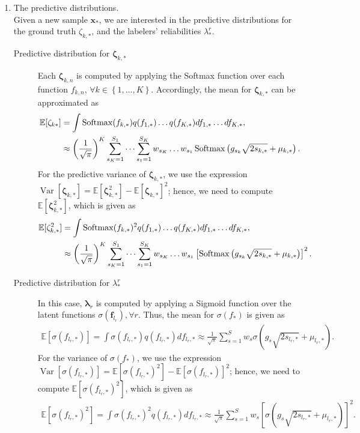\documentclass[9pt]{article}
\providecommand{\ve}[1]{{\bm{#1}}}%
\providecommand{\ve}[1]{{\mathbf{#1}}}
\begin{document}
\begin{enumerate}
\item The predictive distributions.\\
Given a new sample $\ve{x}_{*}$, we are interested in the predictive distributions for the ground truth $\zeta_{k,*}$, and the labelers' reliabilities $\lambda_{*}^r$.
\begin{description}
    \item[Predictive distribution for $\mathbf{\zeta}_{k,*}$] Each $\mathbf{\zeta}_{k,n}$ is computed by applying the Softmax function over each function $f_{k,n}$, $\forall k \in\left\{1,\dots , K\right\}$. Accordingly, the mean for $\mathbf{\zeta}_{k,*}$ can be approximated as
    \begin{align}
        \notag\mathbb{E}[\zeta_{k*}] &= \int \operatorname{Softmax}(f_{k,*}) q(f_{1,*})\dots q(f_{K,*}) df_{1,*}\dots df_{K,*},\\
        &\approx \left(\frac{1}{\sqrt{\pi}}\right)^{K}\sum_{s_K=1}^{S_1}\cdots \sum_{s_1=1}^{S_K} w_{s_K}\dots w_{s_1} \operatorname{Softmax}\left(g_{s_k}\sqrt{2s_{k,*}} + \mu_{k,*}\right).
    \end{align}
    For the predictive variance of $\mathbf{\zeta}_{k,*}$, we use the expression $\operatorname{Var}[\mathbf{\zeta}_{k,*}] = \mathbb{E}[\mathbf{\zeta}_{k,*}^2] - \mathbb{E}[\mathbf{\zeta}_{k,*}]^2$; hence, we need to compute $\mathbb{E}[\mathbf{\zeta}_{k,*}^2]$, which is given as
    \begin{align}
        \notag\mathbb{E}[\mathbf{\zeta}_{k,*}^2] &= \int \operatorname{Softmax}(f_{k,*})^2 q(f_{1,*})\dots q(f_{K,*}) df_{1,*}\dots df_{K,*},\\
        &\approx \left(\frac{1}{\sqrt{\pi}}\right)^{K}\sum_{s_K=1}^{S_1}\cdots \sum_{s_1=1}^{S_K} w_{s_K}\dots w_{s_1} \left[\operatorname{Softmax}\left(g_{s_k}\sqrt{2s_{k,*}} + \mu_{k,*}\right)\right]^2.
    \end{align}
    \item[Predictive distribution for $\lambda_{*}^r$] In this case, $\bm{\lambda}_r$ is computed by applying a Sigmoid function over the latent functions $\sigma(\mathbf{f}_{l_r}), \forall r$. Thus, the mean for $\sigma(f_{*})$ is given as
    \begin{align}
        \mathbb{E}[\sigma(f_{l_r,*})] = \int \sigma(f_{l_r,*}) q(f_{l_r,*})df_{l_r,*} \approx \frac{1}{\sqrt{\pi}}\sum_{s=1}^{S}w_s \sigma\left(g_s\sqrt{2s_{l_r,*}}  + \mu_{l_r,*}\right).
    \end{align}
    For the variance of $\sigma(f_{*})$, we use the expression $\operatorname{Var}[\sigma(f_{l_r,*})] = \mathbb{E}[\sigma(f_{l_r,*})^2] - \mathbb{E}[\sigma(f_{l_r,*})]^2$; hence, we need to compute $\mathbb{E}[\sigma(f_{l_r,*})^2]$, which is given as
    \begin{align}
        \mathbb{E}[\sigma(f_{l_r,*})^2] = \int \sigma(f_{l_r,*})^2 q(f_{l_r,*})df_{l_r,*} \approx \frac{1}{\sqrt{\pi}}\sum_{s=1}^{S}w_s \left[\sigma\left(g_s\sqrt{2s_{l_r,*}}  + \mu_{l_r,*}\right)\right]^2.
    \end{align}
\end{description}
\end{enumerate}
\end{document}
